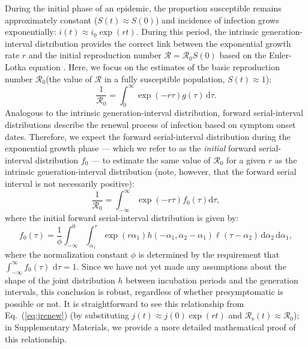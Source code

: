 \documentclass[12pt]{article}
\newcommand{\eref}[1]{Eq.~(\ref{eq:#1})}
\newcommand{\Rx}[1]{\ensuremath{{\mathcal R}_{#1}}\xspace}
\newcommand{\Ro}{\Rx{0}}
\newcommand{\Rs}{\Rx{\mathrm{s}}}
\newcommand{\RR}{\ensuremath{{\mathcal R}}\xspace}
\newcommand{\dd}[1]{\ensuremath{\, \mathrm{d}#1}}
\newcommand{\dtau}{\dd{\tau}}
\newcommand{\pinf}{\ensuremath{\alpha_1}} %
\newcommand{\sinf}{\ensuremath{\alpha_2}} %
\newcommand{\idist}{\ell} %
\begin{document}
During the initial phase of an epidemic, the proportion susceptible remains approximately constant ($S(t) \approx S(0)$) and incidence of infection grows exponentially: $i(t) \approx i_0\exp(rt)$.
During this period, the intrinsic generation-interval distribution provides the correct link between the exponential growth rate $r$ and the initial reproduction number $\RR=\Ro S(0)$ based on the Euler-Lotka equation \citep{wallinga2007generation}.
Here, we focus on the estimates of the basic reproduction number \Ro (the value of \RR in a fully susceptible population, $S(t) \approx 1$):
\begin{equation}
\frac{1}{\Ro} = \int_0^\infty \exp(-r\tau) g(\tau) \dtau.
\label{eq:Rgen}
\end{equation}
Analogous to the intrinsic generation-interval distribution, 
forward serial-interval distributions describe the renewal process of infection based on symptom onset dates.
Therefore, we expect the forward serial-interval distribution during the exponential growth phase --- which we refer to as the \emph{initial} forward serial-interval distribution $f_0$ --- to estimate the same value of \Ro for a given $r$ as the intrinsic generation-interval distribution (note, however, that the forward serial interval is not necessarily positive):
\begin{equation}
\frac{1}{\Ro} = \int_{-\infty}^\infty \exp(-r\tau) f_{0}(\tau) \mathrm{d} \tau,
\label{eq:Rforward}
\end{equation}
where the initial forward serial-interval distribution is given by:
\begin{equation}
f_{0}(\tau) = \frac{1}{\phi} \int_{-\infty}^{0} \int_{\pinf}^{\tau} \exp(r \pinf) h(-\pinf, \sinf - \pinf) \idist(\tau - \sinf) \, \mathrm{d}\sinf\,\mathrm{d}\pinf,
\label{eq:initialSI}
\end{equation}
where the normalization constant $\phi$ is determined by the
requirement that $\int_{-\infty}^\infty f_{0}(\tau)\,\dtau=1$.
Since we have not yet made any assumptions about the shape of the joint distribution $h$ between incubation periods and the generation intervals, this conclusion is robust, regardless of whether presymptomatic is possible or not.
It is straightforward to see this relationship from \eref{jrenew} (by substituting $j(t) \approx j(0) \exp(rt)$ and $\Rs(t) \approx \Ro$);
in Supplementary Materials, we provide a more detailed mathematical proof of this relationship.
\end{document}
